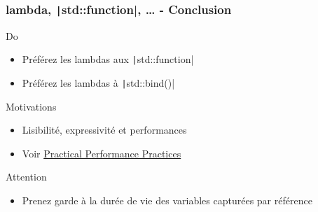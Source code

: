 \documentclass[C++.tex]{subfiles}
\begin{document}
\begin{frame}[fragile]
	\frametitle{lambda, \texttt|std::function|, \ldots{} - Conclusion}
	\begin{exampleblock}{Do}
		\begin{itemize}
			\item Préférez les lambdas aux \texttt|std::function|
			\item Préférez les lambdas à \texttt|std::bind()|
		\end{itemize}
	\end{exampleblock}


	\begin{block}{Motivations}
		\begin{itemize}
			\item Lisibilité, expressivité et performances
			\item Voir \href{https://github.com/boostcon/cppnow_presentations_2016/blob/master/00_tuesday/practical_performance_practices.pdf}{Practical Performance Practices}
		\end{itemize}

	\end{block}

	\begin{alertblock}{Attention}
		\begin{itemize}
			\item Prenez garde à la durée de vie des variables capturées par référence
		\end{itemize}
	\end{alertblock}
\end{frame}
\end{document}
